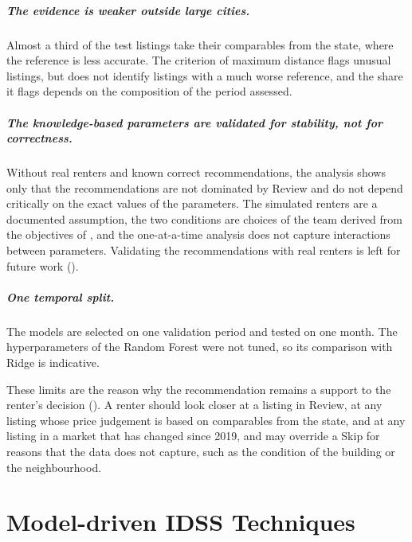 \documentclass[12pt,a4paper]{report}
\begin{document}
\paragraph{The evidence is weaker outside large cities.} Almost a third of
the test listings take their comparables from the state, where the reference
is less accurate. The criterion of maximum distance flags unusual listings,
but does not identify listings with a much worse reference, and the share it
flags depends on the composition of the period assessed.

\paragraph{The knowledge-based parameters are validated for stability, not
for correctness.} Without real renters and known correct recommendations,
the analysis shows only that the recommendations are not dominated by Review
and do not depend critically on the exact values of the parameters. The
simulated renters are a documented assumption, the two conditions are
choices of the team derived from the objectives of , and
the one-at-a-time analysis does not capture interactions between
parameters. Validating the recommendations with real renters is left for
future work ().

\paragraph{One temporal split.} The models are selected on one validation
period and tested on one month. The hyperparameters of the Random Forest
were not tuned, so its comparison with Ridge is indicative.

These limits are the reason why the recommendation remains a support to the
renter's decision (). A renter should look closer at a
listing in Review, at any listing whose price judgement is based on
comparables from the state, and at any listing in a market that has
changed since 2019, and may override a Skip for reasons that the data does
not capture, such as the condition of the building or the neighbourhood.

\chapter{Model-driven IDSS Techniques}
\label{ch:modeldriven}
\end{document}
